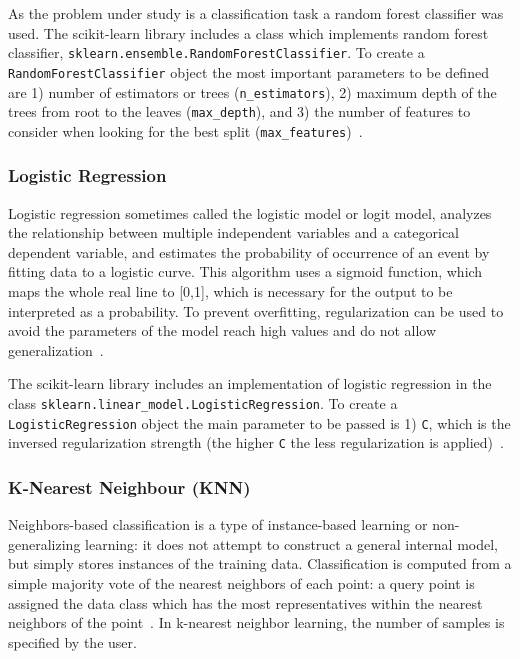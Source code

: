 \documentclass[letterpaper,10pt]{article}
\theoremstyle{mytheor}
\begin{document}
As the problem under study is a classification task a random forest classifier was used. The scikit-learn library includes a class which implements random forest classifier, \lstinline|sklearn.ensemble.RandomForestClassifier|. To create a \lstinline|RandomForestClassifier| object the most important parameters to be defined are 1)  number of estimators or trees (\lstinline|n_estimators|), 2) maximum depth of the trees from root to the leaves (\lstinline|max_depth|), and  3) the number of features to consider when looking for the best split (\lstinline|max_features|)~\cite{scikit-learn}. 

\subsubsection{Logistic Regression}
Logistic regression sometimes called the logistic model or logit model, analyzes the relationship between multiple independent variables and a categorical dependent variable, and estimates the probability of occurrence of an event by fitting data to a logistic curve. This algorithm uses a sigmoid function, which maps the whole real line to [0,1], which is necessary for the output to be interpreted as a probability. To prevent overfitting, regularization can be used to avoid the parameters of the model reach high values and do not allow generalization~\cite{park2013introduction}.

The scikit-learn library includes an implementation of logistic regression in the class \lstinline|sklearn.linear_model.LogisticRegression|. To create a \lstinline|LogisticRegression| object the main parameter to be passed is 1) \lstinline|C|, which is the inversed regularization strength (the higher \lstinline|C| the less regularization is applied)~\cite{scikit-learn}. 

\subsubsection{K-Nearest Neighbour (KNN)}
Neighbors-based classification is a type of instance-based learning or non-generalizing learning: it does not attempt to construct a general internal model, but simply stores instances of the training data. Classification is computed from a simple majority vote of the nearest neighbors of each point: a query point is assigned the data class which has the most representatives within the nearest neighbors of the point~\cite{knnsklearn}. In k-nearest neighbor learning, the number of samples is specified by the user.
\end{document}
